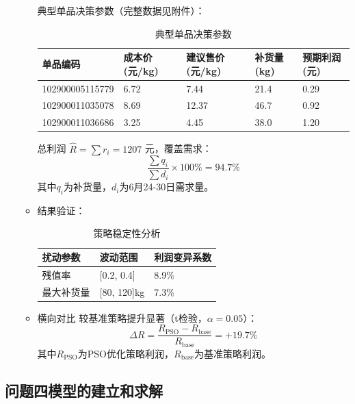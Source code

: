 \documentclass{cumcmthesis} %
\begin{document}
\begin{enumerate}
\begin{itemize}
        
        典型单品决策参数（完整数据见附件）：
        \begin{table}[htbp]
            \centering
            \caption{典型单品决策参数}
            \label{tab:items}
            \begin{tabular}{lllll}
            \toprule
            单品编码 & 成本价(元/kg) & 建议售价(元/kg) & 补货量(kg) & 预期利润(元) \\
            \midrule
            102900005115779 & 6.72 & 7.44 & 21.4 & 0.29 \\
            102900011035078 & 8.69 & 12.37 & 46.7 & 0.92 \\
            102900011036686 & 3.25 & 4.45 & 38.0 & 1.20 \\
            \bottomrule
            \end{tabular}
            \end{table}    

            总利润 $\hat{R}=\sum r_i=1207$ 元，覆盖需求：
            $$
            \frac{\sum q_i}{\sum d_i} \times 100\% = 94.7\%
            $$
            其中$q_i$为补货量，$d_i$为6月24-30日需求量。

        \item 结果验证：    
        \begin{table}[htbp]
            \centering
            \caption{策略稳定性分析}
            \label{tab:robustness}
            \begin{tabular}{lll}
            \toprule
            扰动参数 & 波动范围 & 利润变异系数 \\
            \midrule
            残值率 & [0.2, 0.4] & 8.9\% \\
            最大补货量 & [80, 120]kg & 7.3\% \\
            \bottomrule
            \end{tabular}
            \end{table}
               
        \item 横向对比   
        较基准策略提升显著（t检验，$\alpha=0.05$）：
        $$
        \Delta R=\frac{R_{\text{PSO}}-R_{\text{base}}}{R_{\text{base}}}=+19.7\%
        $$
        其中$R_{\text{PSO}}$为PSO优化策略利润，$R_{\text{base}}$为基准策略利润。
    \end{itemize}
\end{enumerate}


\subsection{问题四模型的建立和求解}
\end{document}
